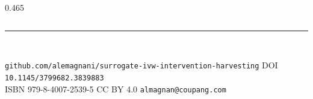 \documentclass[final]{beamer}
\begin{document}
\begin{frame}[t]{}
\begin{columns}[t]
\begin{column}{0.465\paperwidth}
\end{column}
\end{columns}

\vspace{0.3cm}
{\color{rule}\rule{\textwidth}{4pt}}\\[0.3cm]
\begin{center}{\large\color{greytext}
\texttt{github.com/alemagnani/surrogate-ivw-intervention-harvesting}
\quad\textbullet\quad DOI \texttt{10.1145/3799682.3839883}\\[0.15em]
ISBN 979-8-4007-2539-5 \quad\textbullet\quad CC BY 4.0
\quad\textbullet\quad \texttt{almagnan@coupang.com}}\end{center}

\end{frame}
\end{document}
